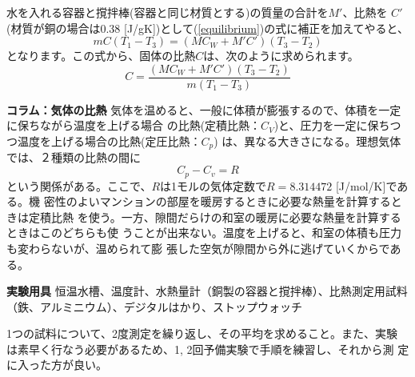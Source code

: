 水を入れる容器と撹拌棒(容器と同じ材質とする)の質量の合計を$M'$、比熱を 
$C'$(材質が銅の場合は0.38 [J/gK])として(\ref{equilibrium})の式に補正を加えてやると、
\begin{equation}
m C (T_1-T_3) = (M C_W+M'C') (T_3-T_2)
\end{equation}
となります。この式から、固体の比熱$C$は、次のように求められます。
\begin{equation}
\boxed{
C = \frac{(M C_W+M'C') (T_3-T_2)}{m (T_1-T_3) }
}
\label{calibrated}
\end{equation}


\bigskip

\begin{itembox}[l]{\bf コラム：気体の比熱}
気体を温めると、一般に体積が膨張するので、体積を一定に保ちながら温度を上げる場合 
の比熱(定積比熱：$C_V$)と、圧力を一定に保ちつつ温度を上げる場合の比熱(定圧比熱：$C_p$) 
は、異なる大きさになる。理想気体では、２種類の比熱の間に
\[
C_p-C_v=R 
\]
という関係がある。ここで、$R$は1モルの気体定数で$R=8.314472$ [J/mol/K]である。機 
密性のよいマンションの部屋を暖房するときに必要な熱量を計算するときは定積比熱
を使う。一方、隙間だらけの和室の暖房に必要な熱量を計算するときはこのどちらも使
うことが出来ない。温度を上げると、和室の体積も圧力も変わらないが、温められて膨
張した空気が隙間から外に逃げていくからである。
\end{itembox}



\newpage

\jikken

\begin{itemsquarebox}[c]{\bf 実験用具}
恒温水槽、温度計、水熱量計（銅製の容器と撹拌棒）、比熱測定用試料（鉄、アルミニウム）、デジタルはかり、ストップウォッチ
\end{itemsquarebox}

\bigskip


1つの試料について、2度測定を繰り返し、その平均を求めること。また、実験 
は素早く行なう必要があるため、1, 2回予備実験で手順を練習し、それから測 
定に入った方が良い。

